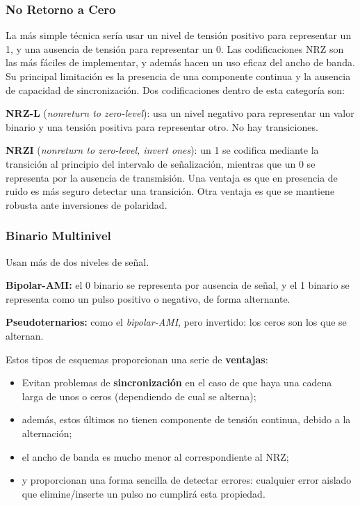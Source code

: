 \documentclass[10pt,a4paper]{article}
\begin{document}
\subsubsection{No Retorno a Cero}
La más simple técnica sería usar un nivel de tensión positivo para representar un 1, y una ausencia de tensión para representar un 0. Las codificaciones NRZ son las más fáciles de implementar, y además hacen un uso eficaz del ancho de banda. Su principal limitación es la presencia de una componente continua y la ausencia de capacidad de sincronización. Dos codificaciones dentro de esta categoría son:
\begin{description}
\item \textbf{NRZ-L} (\textit{nonreturn to zero-level}): usa un nivel negativo para representar un valor binario y una tensión positiva para representar otro. No hay transiciones.
\item \textbf{NRZI} (\textit{nonreturn to zero-level, invert ones}): un 1 se codifica mediante la transición al principio del intervalo de señalización, mientras que un 0 se representa por la ausencia de transmisión.  Una ventaja es que en presencia de ruido es más seguro detectar una transición. Otra ventaja es que se mantiene robusta ante inversiones de polaridad.
\end{description}

\subsubsection{Binario Multinivel}
Usan más de dos niveles de señal.
\begin{description}
\item \textbf{Bipolar-AMI:} el 0 binario se representa por ausencia de señal, y el 1 binario se representa como un pulso positivo o negativo, de forma alternante.
\item \textbf{Pseudoternarios:} como el \textit{bipolar-AMI}, pero invertido: los ceros son los que se alternan.
\end{description}
Estos tipos de esquemas proporcionan una serie de \textbf{ventajas}:
\begin{itemize}
\item Evitan problemas de \textbf{sincronización} en el caso de que haya una cadena larga de unos o ceros (dependiendo de cual se alterna);
\item además, estos últimos no tienen componente de tensión continua, debido a la alternación;
\item el ancho de banda es mucho menor al correspondiente al NRZ;
\item y proporcionan una forma sencilla de detectar errores: cualquier error aislado que elimine/inserte un pulso no cumplirá esta propiedad.
\end{itemize}
\end{document}
